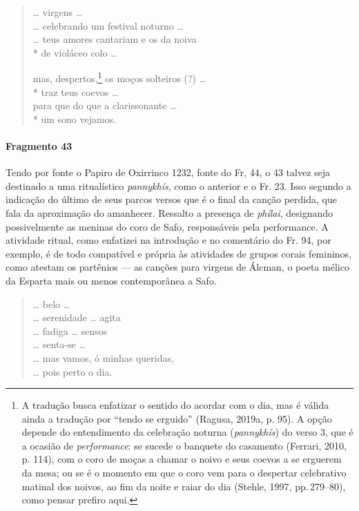 {\begin{verse}
\ldots{} virgens \ldots{}\\
\ldots{} celebrando um festival noturno \ldots{}\\
\ldots{} teus amores cantariam e os da noiva\\*
de violáceo colo \ldots{}

mas, despertos,\footnote{A tradução busca enfatizar o sentido do acordar com o dia, mas é válida ainda a tradução por ``tendo se erguido'' (Ragusa, 2019a, p. 95). A opção depende do entendimento da celebração noturna (\textit{pannykhís}) do verso 3, que é a ocasião de \textit{performance}:  se sucede o banquete do casamento (Ferrari, 2010, p. 114), com o coro de moças a chamar o noivo e seus coevos a se erguerem da mesa; ou se é o momento em que o coro vem para o despertar celebrativo matinal dos noivos, ao fim da noite e raiar do dia (Stehle, 1997, pp.\,279--80), como pensar prefiro aqui.} os moços solteiros (?) \ldots{}\\*
traz teus coevos  \ldots{}\\
para que do que a clarissonante \ldots{}\\*
um sono vejamos.
\end{verse}

\paragraph{Fragmento 43} 

{\small Tendo por fonte o Papiro de Oxirrinco 1232, fonte do Fr, 44, o 43 talvez seja destinado a uma  ritualístico \textit{pannykhís}, como o anterior e o Fr. 23. Isso segundo a indicação do último de seus parcos versos que é o final da canção perdida, que fala da aproximação do amanhecer. Ressalto a presença de \textit{phílai}, designando possivelmente as meninas do coro de Safo, responsáveis pela performance. A atividade ritual, como enfatizei na introdução e no comentário do Fr. 94, por exemplo, é de todo compatível e própria às atividades de grupos corais femininos, como atestam os partênios --- as canções para virgens de Álcman, o poeta mélico da Esparta mais ou menos contemporânea a Safo.}

\begin{verse}
\ldots{} belo \ldots{}\\
\ldots{} serenidade \ldots{} agita\\
\ldots{} fadiga \ldots{} sensos\\
\ldots{} senta-se \ldots{}\\
\ldots{} mas vamos, ó minhas queridas,\\
\ldots{} pois perto o dia.
\end{verse}

}
